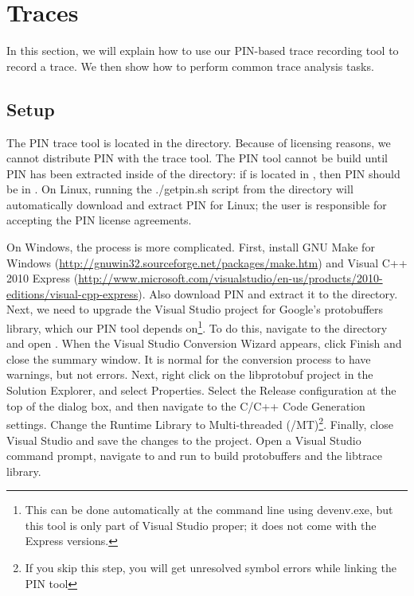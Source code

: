 \section{Traces}

In this section, we will explain how to use our PIN-based trace
recording tool to record a trace.  We then show how to perform common
trace analysis tasks.

\subsection{Setup}

The PIN trace tool is located in the  directory.
Because of licensing reasons, we cannot distribute PIN with the trace
tool.  The PIN tool cannot be build until PIN has been extracted
inside of the \bap directory: if \bap is located in
, then PIN should be in
.  On Linux, running the ./getpin.sh script
from the  directory will
automatically download and extract PIN for Linux; the user is
responsible for accepting the PIN license agreements.

On Windows, the process is more complicated.  First, install GNU Make
for Windows (\url{http://gnuwin32.sourceforge.net/packages/make.htm})
and Visual C++ 2010 Express
(\url{http://www.microsoft.com/visualstudio/en-us/products/2010-editions/visual-cpp-express}).
Also download PIN and extract it to the 
directory.  Next, we need to upgrade the Visual Studio project for
Google's protobuffers library, which our PIN tool depends
on\footnote{This can be done automatically at the command line using
  devenv.exe, but this tool is only part of Visual Studio proper; it
  does not come with the Express versions.}.  To do this, navigate to
the 
directory and open .  When the Visual Studio
Conversion Wizard appears, click Finish and close the summary window.
It is normal for the conversion process to have warnings, but not
errors.  Next, right click on the libprotobuf project in the Solution
Explorer, and select Properties.  Select the Release configuration at
the top of the dialog box, and then navigate to the C/C++ Code
Generation settings.  Change the Runtime Library to Multi-threaded
(/MT)\footnote{If you skip this step, you will get unresolved symbol
  errors while linking the PIN tool}.  Finally, close Visual Studio
and save the changes to the project.  Open a Visual Studio command
prompt, navigate to
 and run
 to build protobuffers and the
libtrace library.


